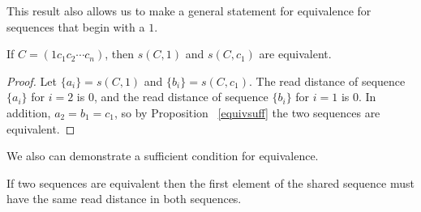 \documentclass[runningheads,a4paper]{llncs}
\begin{document}
This result also allows us to make a general statement for equivalence for sequences that begin with a $1$.
\begin{corollary} If $C = (1 c_1 c_2 \cdots c_n)$, then $s(C, 1)$ and $s(C, c_1)$ are equivalent.
\end{corollary}
\begin{proof}
Let $\{a_i\} = s(C, 1)$ and $\{b_i\} = s(C, c_1)$. The read distance of sequence $\{a_i\}$ for $i=2$ is 0, and the read distance of sequence $\{b_i\}$ for $i = 1$ is 0. In addition, $a_2 = b_1 = c_1$, so by Proposition ~\ref{equivsuff} the two sequences are equivalent.
\end{proof}

We also can demonstrate a sufficient condition for equivalence. 
\begin{theorem} If two sequences are equivalent then the first element of the shared sequence must have the same read distance in both sequences.
\end{theorem}
\end{document}
